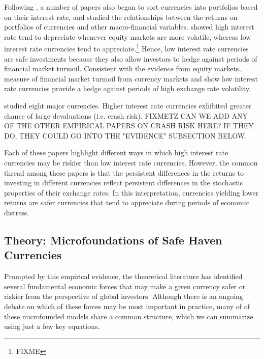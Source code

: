 \documentclass{ar-1col}
\begin{document}
Following \citet{LustigVerdelhan2007}, a number of papers also began to sort 
currencies into portfolios based on their interest rate, and studied the 
relationships between the returns on portfolios of currencies and other 
macro-financial variables.  
\citet{LustigRoussanovVerdelhan2011} showed high interest rate tend
to depreciate whenever equity markets are more volatile, whereas low
interest rate currencies tend to appreciate.\footnote{\citet{CampbellMedeirosViceira2010} FIXME} Hence, low interest rate
currencies are safe investments because they also allow investors to hedge
against periods of financial market turmoil. Consistent with the evidence
from equity markets, \citet{Menkhoffetal2012} measure of 
financial market turmoil from currency markets and show low interest rate
currencies provide a hedge against periods of high exchange rate volatility. 


\citet{Brunnermeieretal2009} studied eight major currencies. Higher 
interest rate currencies exhibited greater chance of large devaluations (i.e. crash risk).
FIXMETZ CAN WE ADD ANY OF THE OTHER EMPIRICAL PAPERS ON CRASH RISK HERE? IF THEY DO, THEY COULD GO INTO THE "EVIDENCE" SUBSECTION BELOW. 

Each of these papers highlight different ways in which high interest rate currencies may be riskier than low interest rate currencies. However, the 
common thread among these papers is that the persistent differences in the 
returns to investing in different currencies reflect persistent differences in the stochastic properties of their exchange rates. 
In this interpretation, currencies yielding lower returns are safer currencies that tend to
appreciate during periods of economic distress. 

\subsection{Theory: Microfoundations of Safe Haven Currencies}

Prompted by this empirical evidence, the theoretical literature has identified several fundamental economic forces that may make a given currency safer or riskier from the perspective of global investors. Although there is an ongoing debate on which of these forces may be most important in practice, many of of these microfounded models share a common structure, which we can summarize using just a few key equations.
\end{document}

